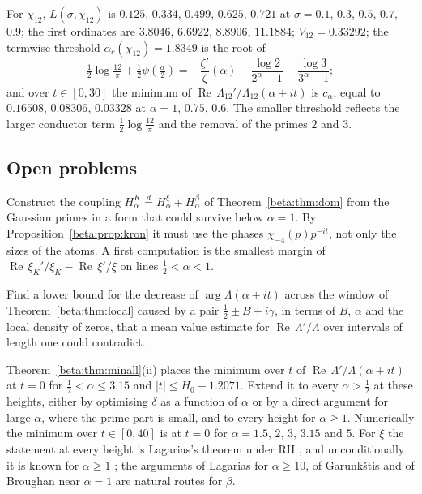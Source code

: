 For $\chi_{12}$, $L(\sigma,\chi_{12})$ is $0.125$, $0.334$, $0.499$, $0.625$, $0.721$ at $\sigma=0.1$, $0.3$, $0.5$, $0.7$, $0.9$; the first ordinates are $3.8046$, $6.6922$, $8.8906$, $11.1884$; $V_{12}=0.33292$; the termwise threshold $\alpha_c(\chi_{12})=1.8349$ is the root of
\[
\tfrac12\log\tfrac{12}\pi+\tfrac12\psi(\tfrac\alpha2)=-\frac{\zeta'}\zeta(\alpha)-\frac{\log2}{2^\alpha-1}-\frac{\log3}{3^\alpha-1};
\]
and over $t\in[0,30]$ the minimum of $\operatorname{Re}\,\Lambda_{12}'/\Lambda_{12}(\alpha+it)$ is $c_\alpha$, equal to $0.16508$, $0.08306$, $0.03328$ at $\alpha=1,\,0.75,\,0.6$. The smaller threshold reflects the larger conductor term $\tfrac12\log\frac{12}{\pi}$ and the removal of the primes $2$ and $3$.

\subsection{Open problems}

\begin{problem}[A coupling below $\alpha=1$]\label{op:betacoupling}
Construct the coupling $H^K_\alpha\overset{d}{=}H^\xi_\alpha+H^\beta_\alpha$ of Theorem~\ref{beta:thm:dom} from the Gaussian primes in a form that could survive below $\alpha=1$. By Proposition~\ref{beta:prop:kron} it must use the phases $\chi_{-4}(p)p^{-it}$, not only the sizes of the atoms. A first computation is the smallest margin of $\operatorname{Re}\,\xi_K'/\xi_K-\operatorname{Re}\,\xi'/\xi$ on lines $\tfrac12<\alpha<1$.
\end{problem}

\begin{problem}\label{op:betawindows}
Find a lower bound for the decrease of $\arg\Lambda(\alpha+it)$ across the window of Theorem~\ref{beta:thm:local} caused by a pair $\tfrac12\pm B+i\gamma$, in terms of $B$, $\alpha$ and the local density of zeros, that a mean value estimate for $\operatorname{Re}\,\Lambda'/\Lambda$ over intervals of length one could contradict.
\end{problem}

\begin{problem}\label{op:betalines}
Theorem~\ref{beta:thm:minall}(ii) places the minimum over $t$ of $\operatorname{Re}\,\Lambda'/\Lambda(\alpha+it)$ at $t=0$ for $\tfrac12<\alpha\le3.15$ and $|t|\le H_0-1.2071$. Extend it to every $\alpha>\tfrac12$ at these heights, either by optimising $\delta$ as a function of $\alpha$ or by a direct argument for large $\alpha$, where the prime part is small, and to every height for $\alpha\ge1$. Numerically the minimum over $t\in[0,40]$ is at $t=0$ for $\alpha=1.5,\,2,\,3,\,3.15$ and $5$. For $\xi$ the statement at every height is Lagarias's theorem under RH \cite{lagarias1999}, and unconditionally it is known for $\alpha\ge1$ \cite{garunkstis2002}; the arguments of Lagarias for $\alpha\ge10$, of Garunk\v{s}tis \cite{garunkstis2000,garunkstis2002} and of Broughan \cite{broughan2009} near $\alpha=1$ are natural routes for $\beta$.
\end{problem}

